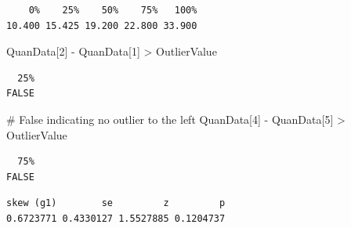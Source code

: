 \documentclass[
  letterpaper,
  DIV=11,
  numbers=noendperiod]{scrreprt}
\newenvironment{Shaded}{\begin{snugshade}}{\end{snugshade}}
\newcommand{\CommentTok}[1]{\textcolor[rgb]{0.37,0.37,0.37}{#1}}
\newcommand{\DecValTok}[1]{\textcolor[rgb]{0.68,0.00,0.00}{#1}}
\newcommand{\FunctionTok}[1]{\textcolor[rgb]{0.28,0.35,0.67}{#1}}
\newcommand{\NormalTok}[1]{\textcolor[rgb]{0.00,0.23,0.31}{#1}}
\newcommand{\OtherTok}[1]{\textcolor[rgb]{0.00,0.23,0.31}{#1}}
\newcommand{\SpecialCharTok}[1]{\textcolor[rgb]{0.37,0.37,0.37}{#1}}
\begin{document}
\begin{Shaded}
\end{Shaded}

\begin{verbatim}
    0%    25%    50%    75%   100% 
10.400 15.425 19.200 22.800 33.900 
\end{verbatim}

\begin{Shaded}
\begin{Highlighting}[]
\NormalTok{QuanData[}\DecValTok{2}\NormalTok{] }\SpecialCharTok{{-}}\NormalTok{ QuanData[}\DecValTok{1}\NormalTok{] }\SpecialCharTok{\textgreater{}}\NormalTok{ OutlierValue}
\end{Highlighting}
\end{Shaded}

\begin{verbatim}
  25% 
FALSE 
\end{verbatim}

\begin{Shaded}
\begin{Highlighting}[]
\CommentTok{\# False indicating no outlier to the left}
\NormalTok{QuanData[}\DecValTok{4}\NormalTok{] }\SpecialCharTok{{-}}\NormalTok{ QuanData[}\DecValTok{5}\NormalTok{] }\SpecialCharTok{\textgreater{}}\NormalTok{ OutlierValue}
\end{Highlighting}
\end{Shaded}

\begin{verbatim}
  75% 
FALSE 
\end{verbatim}

\begin{Shaded}
\end{Shaded}

\begin{verbatim}
skew (g1)        se         z         p 
0.6723771 0.4330127 1.5527885 0.1204737 
\end{verbatim}

\begin{Shaded}
\end{Shaded}
\end{document}
